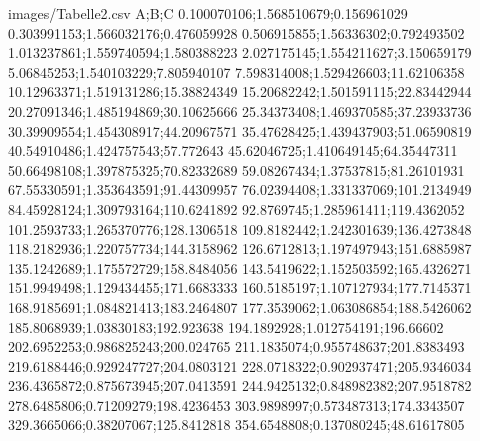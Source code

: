 \begin{filecontents}[overwrite]{images/Tabelle2.csv}
    A;B;C
    0.100070106;1.568510679;0.156961029
    0.303991153;1.566032176;0.476059928
    0.506915855;1.56336302;0.792493502
    1.013237861;1.559740594;1.580388223
    2.027175145;1.554211627;3.150659179
    5.06845253;1.540103229;7.805940107
    7.598314008;1.529426603;11.62106358
    10.12963371;1.519131286;15.38824349
    15.20682242;1.501591115;22.83442944
    20.27091346;1.485194869;30.10625666
    25.34373408;1.469370585;37.23933736
    30.39909554;1.454308917;44.20967571
    35.47628425;1.439437903;51.06590819
    40.54910486;1.424757543;57.772643
    45.62046725;1.410649145;64.35447311
    50.66498108;1.397875325;70.82332689
    59.08267434;1.37537815;81.26101931
    67.55330591;1.353643591;91.44309957
    76.02394408;1.331337069;101.2134949
    84.45928124;1.309793164;110.6241892
    92.8769745;1.285961411;119.4362052
    101.2593733;1.265370776;128.1306518
    109.8182442;1.242301639;136.4273848
    118.2182936;1.220757734;144.3158962
    126.6712813;1.197497943;151.6885987
    135.1242689;1.175572729;158.8484056
    143.5419622;1.152503592;165.4326271
    151.9949498;1.129434455;171.6683333
    160.5185197;1.107127934;177.7145371
    168.9185691;1.084821413;183.2464807
    177.3539062;1.063086854;188.5426062
    185.8068939;1.03830183;192.923638
    194.1892928;1.012754191;196.66602
    202.6952253;0.986825243;200.024765
    211.1835074;0.955748637;201.8383493
    219.6188446;0.929247727;204.0803121
    228.0718322;0.902937471;205.9346034
    236.4365872;0.875673945;207.0413591
    244.9425132;0.848982382;207.9518782
    278.6485806;0.71209279;198.4236453
    303.9898997;0.573487313;174.3343507
    329.3665066;0.38207067;125.8412818
    354.6548808;0.137080245;48.61617805
\end{filecontents}